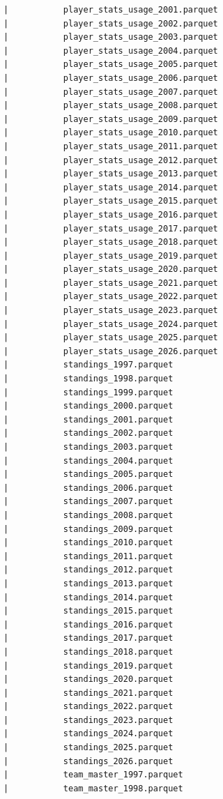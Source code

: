 \begin{lstlisting}
      |           player_stats_usage_2001.parquet
      |           player_stats_usage_2002.parquet
      |           player_stats_usage_2003.parquet
      |           player_stats_usage_2004.parquet
      |           player_stats_usage_2005.parquet
      |           player_stats_usage_2006.parquet
      |           player_stats_usage_2007.parquet
      |           player_stats_usage_2008.parquet
      |           player_stats_usage_2009.parquet
      |           player_stats_usage_2010.parquet
      |           player_stats_usage_2011.parquet
      |           player_stats_usage_2012.parquet
      |           player_stats_usage_2013.parquet
      |           player_stats_usage_2014.parquet
      |           player_stats_usage_2015.parquet
      |           player_stats_usage_2016.parquet
      |           player_stats_usage_2017.parquet
      |           player_stats_usage_2018.parquet
      |           player_stats_usage_2019.parquet
      |           player_stats_usage_2020.parquet
      |           player_stats_usage_2021.parquet
      |           player_stats_usage_2022.parquet
      |           player_stats_usage_2023.parquet
      |           player_stats_usage_2024.parquet
      |           player_stats_usage_2025.parquet
      |           player_stats_usage_2026.parquet
      |           standings_1997.parquet
      |           standings_1998.parquet
      |           standings_1999.parquet
      |           standings_2000.parquet
      |           standings_2001.parquet
      |           standings_2002.parquet
      |           standings_2003.parquet
      |           standings_2004.parquet
      |           standings_2005.parquet
      |           standings_2006.parquet
      |           standings_2007.parquet
      |           standings_2008.parquet
      |           standings_2009.parquet
      |           standings_2010.parquet
      |           standings_2011.parquet
      |           standings_2012.parquet
      |           standings_2013.parquet
      |           standings_2014.parquet
      |           standings_2015.parquet
      |           standings_2016.parquet
      |           standings_2017.parquet
      |           standings_2018.parquet
      |           standings_2019.parquet
      |           standings_2020.parquet
      |           standings_2021.parquet
      |           standings_2022.parquet
      |           standings_2023.parquet
      |           standings_2024.parquet
      |           standings_2025.parquet
      |           standings_2026.parquet
      |           team_master_1997.parquet
      |           team_master_1998.parquet

\end{lstlisting}
